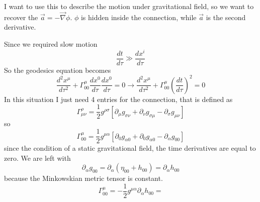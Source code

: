 I want to use this to describe the motion under gravitational field, so we want to recover the $\vec{a} = -\vec{\nabla } \phi $. $\phi $ is hidden inside the connection, while $\vec{a}$ is the second derivative. \par
Since we required slow motion 
\[
\frac{d t}{d \tau } \gg \frac{d x^{i}}{d \tau }	
\]
So the geodesics equation becomes
\begin{equation}
\frac{d ^{2}x^{\mu }}{d \tau ^{2}} + \Gamma ^{\mu }_{00}\frac{d x^{0}}{d \tau }\frac{d x^{0}}{d \tau } = 0 \to  \frac{d ^{2}x^{\mu }}{d \tau ^{2}} + \Gamma ^{\mu }_{00}\left( \frac{d t}{d \tau } \right)^{2} = 0
\end{equation}
In this situation I just need 4 entries for the connection, that is defined as
\[
	\Gamma ^{\rho }_{\mu \nu } = \frac{1}{2} g^{\rho \sigma }\left[ \partial_{\mu } g_{\sigma\nu } + \partial_{\nu }g_{\sigma \mu } - \partial_{\sigma }g_{\mu \nu } \right]
\]
so
\begin{equation}
	\Gamma ^{\mu }_{00} = \frac{1}{2} g^{\mu \alpha } \left[ \partial_{0}g_{\alpha 0} + \partial_{0}g_{\alpha 0} - \partial_{\alpha }g_{00} \right]
\end{equation}
since the condition of a static gravitational field, the time derivatives are equal to zero. We are left with 
\[
\partial_{\alpha }g_{00} = \partial_{\alpha }\left( \eta _{00} + h_{00} \right) = \partial_{\alpha }h_{00}
\]
because the Minkowskian metric tensor is constant. 
\begin{equation}
\Gamma ^{\mu }_{00} = -\frac{1}{2} g^{\mu \alpha } \partial_{\alpha }h_{00} = 
\end{equation}






















